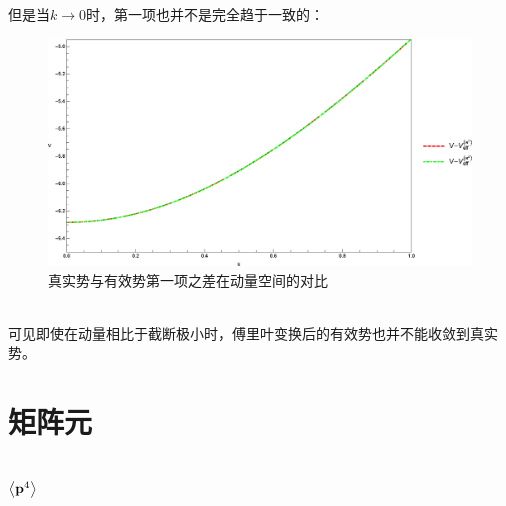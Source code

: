 \documentclass[hyperref,cs4size,titlepage,twoside]{ctexart}
\begin{document}
\setlength{\parindent}{0pt}但是当$k\rightarrow0$时，第一项也并不是完全趋于一致的：
\begin{figure}[!htbp]
  \centering
  \includegraphics[width=6in]{FourierTransformation_4.eps}
  \caption{真实势与有效势第一项之差在动量空间的对比}
\end{figure}\\
可见即使在动量相比于截断极小时，傅里叶变换后的有效势也并不能收敛到真实势。
\clearpage
\section{矩阵元}
\subsection{$\expval{\vb{p}^4}$}
\end{document}
